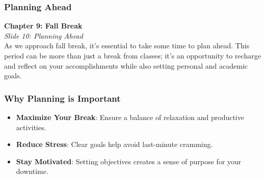 \documentclass[aspectratio=169]{beamer}
\begin{document}
\begin{frame}[fragile]
    \frametitle{Planning Ahead}
    \textbf{Chapter 9: Fall Break} \\
    \textit{Slide 10: Planning Ahead} \\
    
    As we approach fall break, it's essential to take some time to plan ahead. This period can be more than just a break from classes; it’s an opportunity to recharge and reflect on your accomplishments while also setting personal and academic goals.
\end{frame}

\begin{frame}[fragile]
    \frametitle{Why Planning is Important}
    \begin{itemize}
        \item \textbf{Maximize Your Break}: Ensure a balance of relaxation and productive activities.
        \item \textbf{Reduce Stress}: Clear goals help avoid last-minute cramming.
        \item \textbf{Stay Motivated}: Setting objectives creates a sense of purpose for your downtime.
    \end{itemize}
\end{frame}
\end{document}
